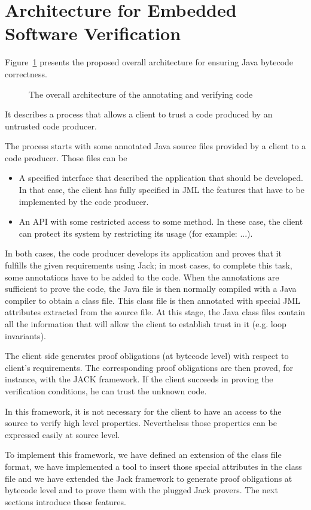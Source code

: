 \section{Architecture for Embedded Software Verification}
\label{architecture_s}	
Figure~\ref{architecture} presents the proposed overall architecture for ensuring Java bytecode correctness. 
\begin{figure}[ht!]
\begin{center}
\caption{The overall architecture of the annotating and verifying code}
\label{architecture}
\end{center}
\end{figure}
It describes a process that allows a client to trust a code produced by an untrusted code producer.

The process starts with some annotated Java source files provided by a client to a code producer. Those files can be
\begin{itemize}
\item A specified interface that described the application that should be developed. In that case, the client has fully specified in JML the features that have to be implemented by the code producer.
\item An API with some restricted access to some method. In these case, the client can protect its system by restricting its usage (for example: ...). 
\end{itemize}
In both cases, the code producer develops its application and proves that it fulfills the given requirements using Jack; 
in most cases, to complete this task, some annotations have to be added to the code.
When the annotations are sufficient to prove the code, the Java file is then normally compiled with a Java compiler to obtain a 
class file. 
This class file is then annotated with special JML attributes extracted from the source file. 
At this stage, the Java class files contain all the information that will allow the client to establish trust in it (e.g. loop invariants).

The client side generates proof obligations (at bytecode level) with respect to client's requirements. 
The corresponding proof obligations are then proved, for instance, with the JACK framework. If the client succeeds in proving 
the verification conditions, he can trust the unknown code. 

In this framework, it is not necessary for the client to have an access to the source to verify high level properties. 
Nevertheless those properties can be expressed easily at source level.

To implement this framework, we have defined an extension of the class file format, we have implemented a tool to insert 
those special attributes in the class file and we have extended the Jack framework to generate proof obligations at bytecode level and to prove them with the plugged Jack provers. The next sections introduce those features.  


